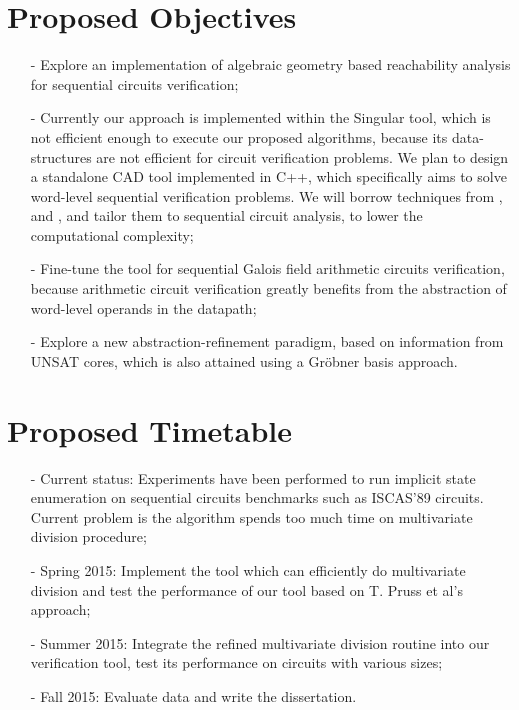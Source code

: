 \section{Proposed Objectives}
\begin{itemize}
\item[-] Explore an implementation of algebraic geometry based reachability analysis for sequential circuits verification;
\item[-] Currently our approach is implemented within the {\sc Singular} tool, which is not efficient enough to execute our
proposed algorithms, because its data-structures are not efficient for circuit verification problems. We plan to design a standalone CAD tool implemented in C++, which specifically aims to solve word-level sequential
verification problems. We will borrow techniques from \cite{timDAC}, \cite{jinpeng} and \cite{f4reduce}, and tailor them to sequential circuit analysis, to lower the computational
complexity;
\item[-] Fine-tune the tool for sequential Galois field arithmetic circuits verification, because arithmetic circuit
verification greatly benefits from the abstraction of word-level operands in the datapath;
\item[-] Explore a new abstraction-refinement paradigm, based on information from UNSAT cores, which is also 
attained using a Gr\"obner basis approach.
\end{itemize}

\section{Proposed Timetable}
\begin{itemize}
\item[-] Current status: Experiments have been performed to run implicit state enumeration on sequential circuits benchmarks
such as ISCAS'89 circuits. Current problem is the algorithm spends too much time on multivariate division procedure;
\item[-] Spring 2015: Implement the tool which can efficiently do multivariate division and test the performance of 
our tool based on T. Pruss et al's \cite{timDAC} approach;
\item[-] Summer 2015: Integrate the refined multivariate division routine into our verification tool, test its
performance on circuits with various sizes;
\item[-] Fall 2015: Evaluate data and write the dissertation.
\end{itemize}